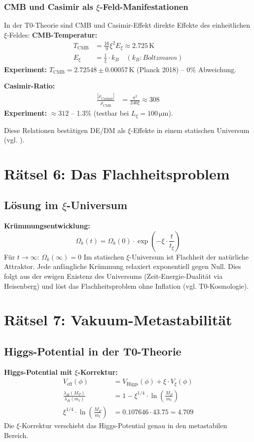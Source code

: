 	\subsubsection{CMB und Casimir als $\xi$-Feld-Manifestationen}
	In der T0-Theorie sind CMB und Casimir-Effekt direkte Effekte des einheitlichen $\xi$-Feldes:
	\textbf{CMB-Temperatur:}
	\begin{align}
		T_{\text{CMB}} &= \frac{16}{9} \xi^2 E_\xi \approx 2.725\,\si{\kelvin} \\
		E_\xi &= \frac{1}{\xi} \cdot k_B \quad (k_B: Boltzmann)
	\end{align}
	\textbf{Experiment:} $T_{\text{CMB}} = 2.72548 \pm 0.00057\,\si{\kelvin}$ (Planck 2018) – 0\% Abweichung.
	
	\textbf{Casimir-Ratio:}
	\begin{align}
		\frac{|\rho_{\text{Casimir}}|}{\rho_{\text{CMB}}} &= \frac{\pi^2}{240 \xi} \approx 308
	\end{align}
	\textbf{Experiment:} $\approx 312$ – 1.3\% (testbar bei $L_\xi = 100\,\si{\micro\meter}$).
	
	Diese Relationen bestätigen DE/DM als $\xi$-Effekte in einem statischen Universum (vgl. \cite{t0_kosmologie}).
	\section{Rätsel 6: Das Flachheitsproblem}
	\subsection{Lösung im $\xi$-Universum}
	\textbf{Krümmungsentwicklung:}
	\begin{equation}
		\Omega_k(t) = \Omega_k(0) \cdot \exp\left(-\xi \cdot \frac{t}{t_\xi}\right)
	\end{equation}
	Für $t \to \infty$: $\Omega_k(\infty) = 0$
	Im statischen $\xi$-Universum ist Flachheit der natürliche Attraktor. Jede anfängliche Krümmung relaxiert exponentiell gegen Null. Dies folgt aus der ewigen Existenz des Universums (Zeit-Energie-Dualität via Heisenberg) und löst das Flachheitsproblem ohne Inflation (vgl. T0-Kosmologie).
	\section{Rätsel 7: Vakuum-Metastabilität}
	\subsection{Higgs-Potential in der T0-Theorie}
	\textbf{Higgs-Potential mit $\xi$-Korrektur:}
	\begin{align}
		V_{\text{eff}}(\phi) &= V_{\text{Higgs}}(\phi) + \xi \cdot V_\xi(\phi) \\
		\frac{\lambda_H(M_P)}{\lambda_H(m_t)} &= 1 - \xi^{1/4} \cdot \ln\left(\frac{M_P}{m_t}\right) \\
		\xi^{1/4} \cdot \ln\left(\frac{M_P}{m_t}\right) &= 0.107646 \cdot 43.75 = 4.709
	\end{align}
	Die $\xi$-Korrektur verschiebt das Higgs-Potential genau in den metastabilen Bereich.
